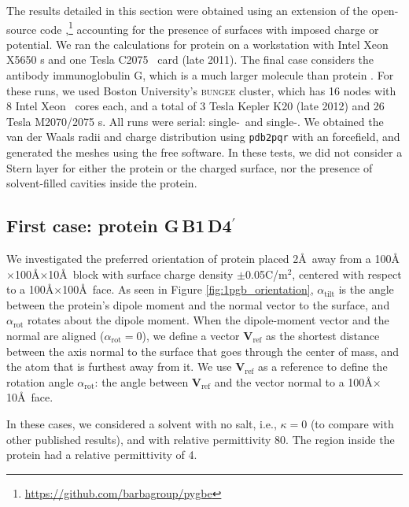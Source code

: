 
The results detailed in this section were obtained using an extension of the open-source code \pygbe,\footnote{\href{https://github.com/barbagroup/pygbe}{https://github.com/barbagroup/pygbe}} accounting for the presence of surfaces with imposed charge or potential.\cite{CooperBarba2015a}
We ran the calculations for protein \gb on a workstation with Intel Xeon X5650 \cpu s  and one \nvidia Tesla C2075 \gpu\ card (late 2011). 
The final case considers the antibody immunoglobulin G, which is a much larger molecule than protein \gb. For these runs, we used Boston University's \textsc{bungee} cluster, which has 16 nodes with 8 Intel Xeon \cpu\ cores each, and a total of 3 \nvidia Tesla Kepler K20 (late 2012) and 26 \nvidia Tesla M2070/2075 \gpu s. All runs were serial: single-\cpu\ and single-\gpu. 
We obtained the van der Waals radii and charge distribution using \texttt{pdb2pqr}\cite{Dolinsky04} with an \amber forcefield, and generated the meshes using the free \msms software.\cite{SannerOlsonSpehner1995}
In these tests, we did not consider a Stern layer for either the protein or the charged surface, nor the presence of solvent-filled cavities inside the protein.

\subsection{First case: protein G\,B1\,D4$^{\prime}$} \label{sec:PGB}

We investigated the preferred orientation of protein \gb placed 2\AA\ away from a 100\AA$\times$100\AA$\times$10\AA\ block with surface charge density $\pm$0.05C/m$^2$, centered with respect to a 100\AA$\times$100\AA\ face.
As seen in Figure \ref{fig:1pgb_orientation}, $\alpha_\text{tilt}$ is the angle between the protein's dipole moment and the normal vector to the surface, and $\alpha_\text{rot}$ rotates about the dipole moment. 
When the dipole-moment vector and the normal are aligned ($\alpha_\text{rot}=0$), we define a vector $\mathbf{V}_\text{ref}$ as the shortest distance between the axis normal to the surface that goes through the center of mass, and the atom that is furthest away from it. 
We use $\mathbf{V}_\text{ref}$ as a reference to define the rotation angle $\alpha_\text{rot}$: the angle between $\mathbf{V}_\text{ref}$ and the vector normal to a 100\AA$\times$10\AA\ face.  

In these cases, we considered a solvent with no salt, i.e., $\kappa=0$ (to compare with other published results), and with relative permittivity 80. The region inside the protein had a relative permittivity of 4.

